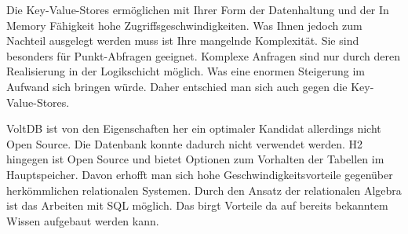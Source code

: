 Die Key-Value-Stores ermöglichen mit Ihrer Form der Datenhaltung und der In Memory Fähigkeit hohe Zugriffsgeschwindigkeiten. Was Ihnen jedoch zum Nachteil ausgelegt werden muss ist Ihre mangelnde Komplexität. Sie sind besonders für Punkt-Abfragen geeignet. Komplexe Anfragen sind nur durch deren Realisierung in der Logikschicht möglich. Was eine enormen Steigerung im Aufwand sich bringen würde. Daher entschied man sich auch gegen die Key-Value-Stores. 

VoltDB ist von den Eigenschaften her ein optimaler Kandidat allerdings nicht Open Source. Die Datenbank konnte dadurch nicht verwendet werden. H2 hingegen ist Open Source und bietet Optionen zum Vorhalten der Tabellen im Hauptspeicher. Davon erhofft man sich hohe Geschwindigkeitsvorteile gegenüber herkömmlichen relationalen Systemen. Durch den Ansatz der relationalen Algebra ist das Arbeiten mit SQL möglich. Das birgt Vorteile da auf bereits bekanntem Wissen aufgebaut werden kann.